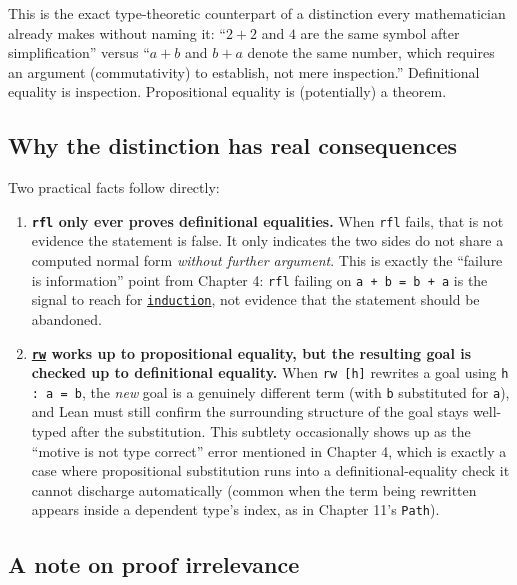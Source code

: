 This is the exact type-theoretic counterpart of a distinction every mathematician already makes without naming it: ``\(2+2\) and \(4\) are the same symbol after simplification'' versus ``\(a+b\) and \(b+a\) denote the same number, which requires an argument (commutativity) to establish, not mere inspection.'' Definitional equality is inspection. Propositional equality is (potentially) a theorem.

\subsection{Why the distinction has real consequences}\label{sec:05-rigor-check:04-defeq-vs-propeq:4}

Two practical facts follow directly:

\begin{enumerate}
\def\labelenumi{\arabic{enumi}.}
\tightlist
\item
  \textbf{\texttt{rfl} only ever proves definitional equalities.} When \texttt{rfl} fails, that is not evidence the statement is false. It only indicates the two sides do not share a computed normal form \emph{without further argument}. This is exactly the ``failure is information'' point from Chapter 4: \texttt{rfl} failing on \texttt{a + b = b + a} is the signal to reach for \href{https://lean-lang.org/doc/reference/latest/Tactic-Proofs/Tactic-Reference/}{\texttt{induction}}, not evidence that the statement should be abandoned.
\item
  \textbf{\href{https://lean-lang.org/doc/reference/latest/Tactic-Proofs/Tactic-Reference/}{\texttt{rw}} works up to propositional equality, but the resulting goal is checked up to definitional equality.} When \texttt{rw [h]} rewrites a goal using \texttt{h : a = b}, the \emph{new} goal is a genuinely different term (with \texttt{b} substituted for \texttt{a}), and Lean must still confirm the surrounding structure of the goal stays well-typed after the substitution. This subtlety occasionally shows up as the ``motive is not type correct'' error mentioned in Chapter 4, which is exactly a case where propositional substitution runs into a definitional-equality check it cannot discharge automatically (common when the term being rewritten appears inside a dependent type's index, as in Chapter 11's \texttt{Path}).
\end{enumerate}

\subsection{A note on proof irrelevance}\label{sec:05-rigor-check:04-defeq-vs-propeq:5}

